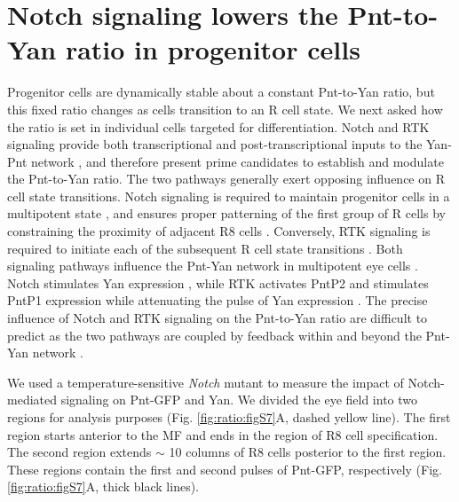 \section{Notch signaling lowers the Pnt-to-Yan ratio in progenitor cells}

Progenitor cells are dynamically stable about a constant Pnt-to-Yan ratio, but this fixed ratio changes as cells transition to an R cell state. We next asked how the ratio is set in individual cells targeted for differentiation. Notch and RTK signaling provide both transcriptional and post-transcriptional inputs to the Yan-Pnt network \cite{Graham2010}, and therefore present prime candidates to establish and modulate the Pnt-to-Yan ratio. The two pathways generally exert opposing influence on R cell state transitions. Notch signaling is required to maintain progenitor cells in a multipotent state \cite{Fortini1993}, and ensures proper patterning of the first group of R cells by constraining the proximity of adjacent R8 cells \cite{Lubensky2011,Gavish2016}. Conversely, RTK signaling is required to initiate each of the subsequent R cell state transitions \cite{Freeman1996}. Both signaling pathways influence the Pnt-Yan network in multipotent eye cells \cite{Brunner1994,Rebay1995,Rogge1995}. Notch stimulates Yan expression \cite{Rohrbaugh2002}, while RTK activates PntP2 and stimulates PntP1 expression \cite{Brunner1994,Shwartz2013} while attenuating the pulse of Yan expression \cite{Rebay1995,Pelaez2015a}. The precise influence of Notch and RTK signaling on the Pnt-to-Yan ratio are difficult to predict as the two pathways are coupled by feedback within and beyond the Pnt-Yan network \cite{Rohrbaugh2002,Kumar2003,Voas2004}.

We used a temperature-sensitive \textit{Notch} mutant \cite{Cagan1989} to measure the impact of Notch-mediated signaling on Pnt-GFP and Yan. We divided the eye field into two regions for analysis purposes (Fig. \ref{fig:ratio:figS7}A, dashed yellow line). The first region starts anterior to the MF and ends in the region of R8 cell specification. The second region extends $\sim$ 10 columns of R8 cells posterior to the first region. These regions contain the first and second pulses of Pnt-GFP, respectively (Fig. \ref{fig:ratio:figS7}A, thick black lines).

